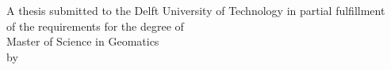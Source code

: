 \thispagestyle{empty}

\begin{titlepage}
	
	
  \begin{addmargin}[-1cm]{-3cm}
    \begin{center}
    	
        \large  
        \hfill
        \vfill


        \begingroup
            \color{tudelft}\spacedallcaps{\myTitle}
        \endgroup

        \vspace{5cm}
        
        A thesis submitted to the Delft University of Technology in partial fulfillment\\ of the requirements for the degree of\\
        \vspace{2cm}
        Master of Science in Geomatics\\
        \vspace{4cm}
        by\\
        \bigskip
        \myName\\
        \bigskip
        \myGraduationMonth\xspace\myGraduationYear\\

        \vfill

    \end{center}  
  \end{addmargin}       
\end{titlepage}  








